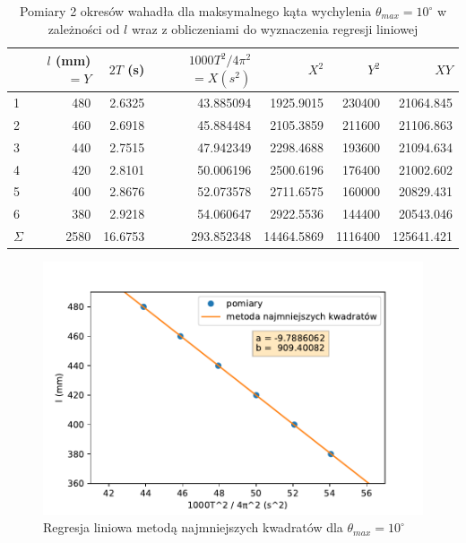 \documentclass[a4paper]{article}
\begin{document}
\begin{table}[h!]
\centering
	\begin{tabular}{lrrrrrr}
	\toprule
	{} & $l$ (mm) $=Y$ &  $2T$ (s) & \small$1000T^2/4\pi^2$\normalsize$=X (s^2)$ & $X^2$ & $Y^2$ & $XY$ \\
	\midrule
	1 &     480 &  2.6325 &  43.885094 &  1925.9015 &  230400 &  21064.845 \\
	2 &     460 &  2.6918 &  45.884484 &  2105.3859 &  211600 &  21106.863 \\
	3 &     440 &  2.7515 &  47.942349 &  2298.4688 &  193600 &  21094.634 \\
	4 &     420 &  2.8101 &  50.006196 &  2500.6196 &  176400 &  21002.602 \\
	5 &     400 &  2.8676 &  52.073578 &  2711.6575 &  160000 &  20829.431 \\
	6 &     380 &  2.9218 &  54.060647 &  2922.5536 &  144400 &  20543.046 \\
	\midrule
	$\Sigma$ & 2580 & 16.6753 & 293.852348 & 14464.5869 & 1116400 & 125641.421 \\
	\end{tabular}
\caption{Pomiary 2 okresów wahadła dla maksymalnego kąta wychylenia $\theta_{max} = 10^\circ$ w  zależności od $l$ wraz z obliczeniami do wyznaczenia regresji liniowej}
\label{pomiary_2}
\end{table}


\begin{figure}[h!]
\centering
	\includegraphics[scale=0.6]{wykres-3_0.pdf}
\caption{Regresja liniowa metodą najmniejszych kwadratów dla $\theta_{max} = 10^\circ$}
\label{regresja_10}
\end{figure}
\end{document}
